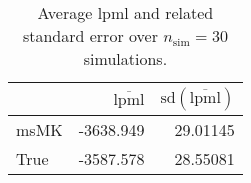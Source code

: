 \begin{table}[H]

\caption{Average lpml and related standard error over $n_{\text{sim}} = 30$ simulations.}
\centering
\begin{tabular}[t]{lrr}
\toprule
  & $\overbar{\text{lpml}}$ & $\text{sd}(\overbar{\text{lpml}})$\\
\midrule
msMK & -3638.949 & 29.01145\\
True & -3587.578 & 28.55081\\
\bottomrule
\end{tabular}
\end{table}